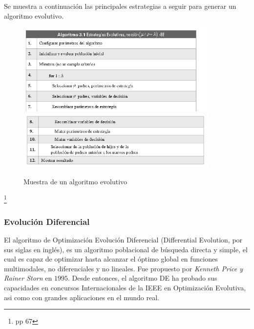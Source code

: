 \documentclass{article}
\begin{document}
Se muestra a continuación las principales estrategias a seguir para generar un algoritmo evolutivo.
\begin{figure}[h!]
    \centering
    \includegraphics[width=10cm]{imgs/Captura de pantalla 2021-01-19 184554.png}
    \includegraphics[width=10cm]{imgs/Captura de pantalla 2021-01-19 184634.png}
    \caption{Muestra de un algoritmo evolutivo}
    \label{fig:my_label}
\end{figure}

\footnote{ \cite{Cuevas(2016)} pp 67}


\subsubsection{Evoluci\'on Diferencial}
El algoritmo de Optimizaci\'on Evoluci\'on Diferencial (Differential Evolution, por sus siglas en ingl\'es), es un algoritmo poblacional de b\'usqueda directa y simple, el cual es capaz de optimizar hasta alcanzar el \'optimo global en funciones multimodales, no diferenciales y no lineales. Fue propuesto por \textit{Kenneth Price y Rainer Storn} en $1995$. Desde entonces, el algoritmo DE ha probado sus capacidades en concursos Internacionales de la IEEE en Optimizaci\'on Evolutiva, asi como con grandes aplicaciones en el mundo real.
\end{document}
